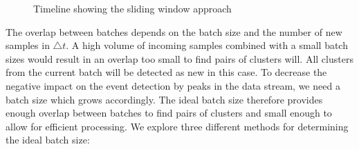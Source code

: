 \begin{figure}[h]
    \centering


    \caption{Timeline showing the sliding window approach}
    \label{fig:timeline}
\end{figure}

The overlap between batches depends on the batch size and the number of new samples in $\triangle t$.
A high volume of incoming samples combined with a small batch sizes
would result in an overlap too small to find pairs of clusters will.
All clusters from the current batch will be detected as new in this case.
To decrease the negative impact on the event detection by peaks in the data stream,
we need a batch size which grows accordingly.
The ideal batch size therefore provides enough overlap between batches to find pairs of clusters
and small enough to allow for efficient processing.
We explore three different methods for determining the ideal batch size:

